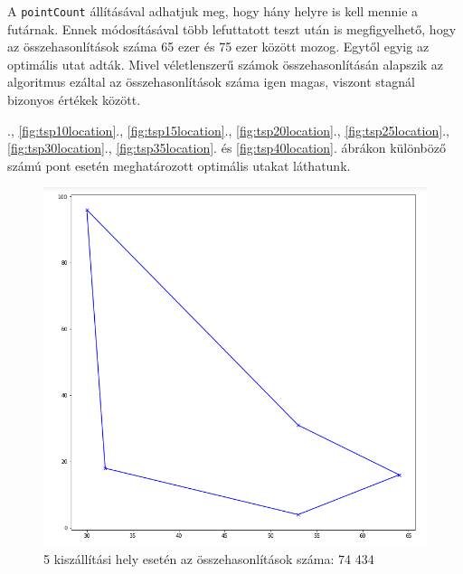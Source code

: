 
A \texttt{pointCount} állításával adhatjuk meg, hogy hány helyre is kell mennie a futárnak. Ennek módosításával több lefuttatott teszt után is megfigyelhető, hogy az összehasonlítások száma 65 ezer és 75 ezer között mozog. Egytől egyig az optimális utat adták. Mivel véletlenszerű számok összehasonlításán alapszik az algoritmus ezáltal az összehasonlítások száma igen magas, viszont stagnál bizonyos értékek között.

., \ref{fig:tsp10location}., \ref{fig:tsp15location}., \ref{fig:tsp20location}., \ref{fig:tsp25location}., \ref{fig:tsp30location}., \ref{fig:tsp35location}. és \ref{fig:tsp40location}. ábrákon különböző számú pont esetén meghatározott optimális utakat láthatunk.

\begin{figure}[h!]
\centering
\includegraphics[scale=0.4]{images/5.png}
\caption{5 kiszállítási hely esetén az összehasonlítások száma: 74 434}
\label{fig:tsp5location}
\end{figure}

